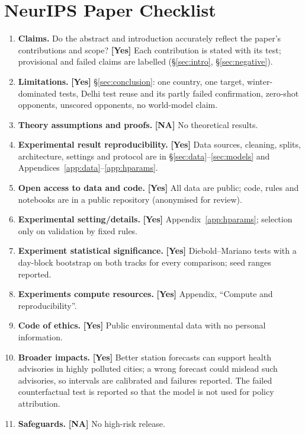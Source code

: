 \documentclass{article}
\newif\ifpreprint
\begin{document}
\section*{NeurIPS Paper Checklist}

\begin{enumerate}[leftmargin=1.5em]
\item \textbf{Claims.} Do the abstract and introduction accurately reflect the paper's contributions and scope?
  \textbf{[Yes]} Each contribution is stated with its test; provisional and failed claims are labelled (\S\ref{sec:intro}, \S\ref{sec:negative}).
\item \textbf{Limitations.} \textbf{[Yes]} \S\ref{sec:conclusion}: one country, one target, winter-dominated tests, Delhi test reuse and its partly failed confirmation, zero-shot opponents, unscored opponents, no world-model claim.
\item \textbf{Theory assumptions and proofs.} \textbf{[NA]} No theoretical results.
\item \textbf{Experimental result reproducibility.} \textbf{[Yes]} Data sources, cleaning, splits, architecture, settings and protocol are in \S\ref{sec:data}--\ref{sec:models} and Appendices~\ref{app:data}--\ref{app:hparams}.
\item \textbf{Open access to data and code.} \textbf{[Yes]} All data are public; code, rules and notebooks are in a public repository (\ifpreprint\url{https://github.com/paradoxailab/paradox-world-model}\else anonymised for review\fi).
\item \textbf{Experimental setting/details.} \textbf{[Yes]} Appendix~\ref{app:hparams}; selection only on validation by fixed rules.
\item \textbf{Experiment statistical significance.} \textbf{[Yes]} Diebold--Mariano tests with a day-block bootstrap on both tracks for every comparison; seed ranges reported.
\item \textbf{Experiments compute resources.} \textbf{[Yes]} Appendix, ``Compute and reproducibility''.
\item \textbf{Code of ethics.} \textbf{[Yes]} Public environmental data with no personal information.
\item \textbf{Broader impacts.} \textbf{[Yes]} Better station forecasts can support health advisories in highly polluted cities; a wrong forecast could mislead such advisories, so intervals are calibrated and failures reported. The failed counterfactual test is reported so that the model is not used for policy attribution.
\item \textbf{Safeguards.} \textbf{[NA]} No high-risk release.

\end{enumerate}
\end{document}

